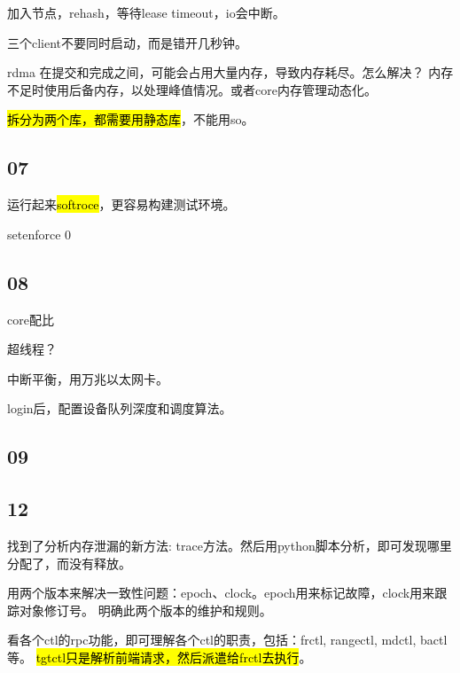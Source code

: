 加入节点，rehash，等待lease timeout，io会中断。

三个client不要同时启动，而是错开几秒钟。

rdma 在提交和完成之间，可能会占用大量内存，导致内存耗尽。怎么解决？
内存不足时使用后备内存，以处理峰值情况。或者core内存管理动态化。

\hl{拆分为两个库，都需要用静态库}，不能用so。

\subsection{07}

运行起来\hl{softroce}，更容易构建测试环境。

setenforce 0

\subsection{08}

core配比

超线程？

中断平衡，用万兆以太网卡。

login后，配置设备队列深度和调度算法。

\subsection{09}

\subsection{12}

找到了分析内存泄漏的新方法: trace方法。然后用python脚本分析，即可发现哪里分配了，而没有释放。

用两个版本来解决一致性问题：epoch、clock。epoch用来标记故障，clock用来跟踪对象修订号。
明确此两个版本的维护和规则。

看各个ctl的rpc功能，即可理解各个ctl的职责，包括：frctl, rangectl, mdctl, bactl等。
\hl{tgtctl只是解析前端请求，然后派遣给frctl去执行}。
